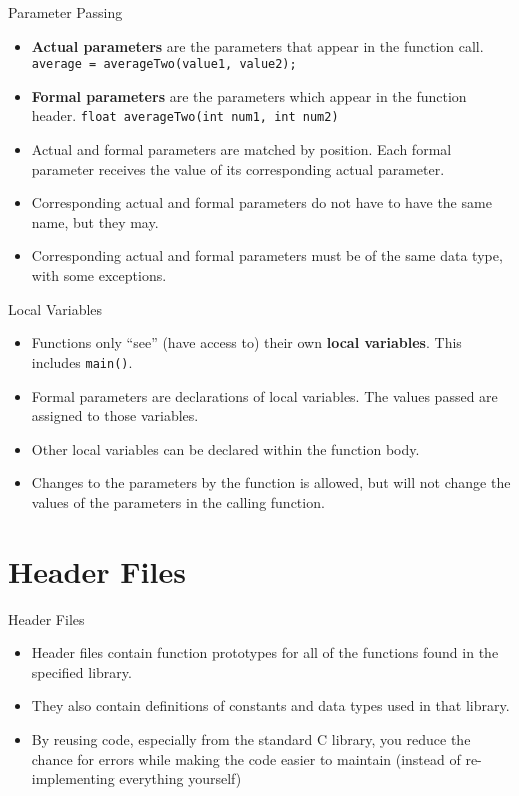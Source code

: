 \documentclass[graphics]{beamer}
\begin{document}
\begin{frame}{Parameter Passing}
    \begin{itemize}
        \item \textbf{Actual parameters} are the parameters that appear in the function call. \texttt{average = averageTwo(value1, value2);}
        \item \textbf{Formal parameters} are the parameters which appear in the function header. \texttt{float averageTwo(int num1, int num2)}
        \item Actual and formal parameters are matched by position. Each formal parameter receives the value of its corresponding actual parameter.
        \item Corresponding actual and formal parameters do not have to have the same name, but they may.
        \item Corresponding actual and formal parameters must be of the same data type, with some exceptions.
    \end{itemize}
\end{frame}

\begin{frame}{Local Variables}
    \begin{itemize}
        \item Functions only ``see'' (have access to) their own \textbf{local variables}. This includes \texttt{main()}.
        \item Formal parameters are declarations of local variables. The values passed are assigned to those variables.
        \item Other local variables can be declared within the function body.
        \item Changes to the parameters by the function is allowed, but will not change the values of the parameters in the calling function.
    \end{itemize}
\end{frame}

\section{Header Files}
\begin{frame}{Header Files}
    \begin{itemize}
        \item Header files contain function prototypes for all of the functions found in the specified library.
        \item They also contain definitions of constants and data types used in that library.
        \item By reusing code, especially from the standard C library, you reduce the chance for errors while making the code easier to maintain (instead of re-implementing everything yourself)
    \end{itemize}
\end{frame}
\end{document}
